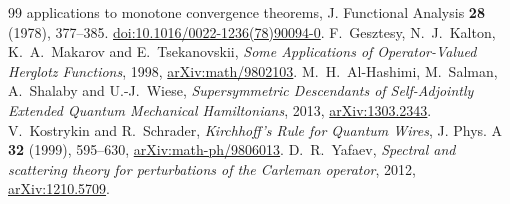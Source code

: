 \begin{thebibliography}{99}
{applications to monotone convergence theorems},
J. Functional Analysis \textbf{28} (1978), 377--385.
\href{https://doi.org/10.1016/0022-1236(78)90094-0}{doi:10.1016/0022-1236(78)90094-0}.
F.~Gesztesy, N.~J.~Kalton, K.~A.~Makarov and E.~Tsekanovskii,
\emph{Some Applications of Operator-Valued Herglotz Functions},
1998, \href{https://arxiv.org/abs/math/9802103}{arXiv:math/9802103}.
M.~H.~Al-Hashimi, M.~Salman, A.~Shalaby and U.-J.~Wiese,
\emph{Supersymmetric Descendants of Self-Adjointly Extended Quantum
Mechanical Hamiltonians},
2013, \href{https://arxiv.org/abs/1303.2343}{arXiv:1303.2343}.
V.~Kostrykin and R.~Schrader, \emph{Kirchhoff's Rule for Quantum Wires},
J. Phys. A \textbf{32} (1999), 595--630,
\href{https://arxiv.org/abs/math-ph/9806013}{arXiv:math-ph/9806013}.
D.~R.~Yafaev, \emph{Spectral and scattering theory for perturbations
of the Carleman operator}, 2012,
\href{https://arxiv.org/abs/1210.5709}{arXiv:1210.5709}.
\end{thebibliography}
